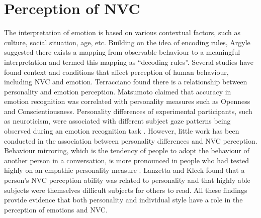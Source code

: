 
\section{Perception of \ac{NVC}}
\label{BackgroundWhatFactorsInfluenceNvcPerception}
\label{BackgroundPeopleVaryInExpression}

The interpretation of emotion is based on various contextual factors, such as culture, social situation, age, etc. Building on the idea of encoding rules, Argyle \cite{Argyle1994} suggested there exists a mapping from observable behaviour to a meaningful interpretation and termed this mapping as ``decoding rules''. Several studies have found context and conditions that affect perception of human behaviour, including \ac{NVC} and emotion. Terracciano \etal \cite{Terracciano2003} found there is a relationship between personality and emotion perception. Matsumoto \etal \cite{Matsumoto2000} claimed that accuracy in emotion recognition was correlated with personality measures such as Openness and Conscientiousness. Personality differences of experimental participants, such as neuroticism, were associated with different subject gaze patterns being observed during an emotion recognition task \cite{Perlman2009}. However, little work has been conducted in the association between personality differences and \ac{NVC} perception. Behaviour mirroring, which is the tendency of people to adopt the behaviour of another person in a conversation, is more pronounced in people who had tested highly on an empathic personality measure \cite{Chartrand1999}. Lanzetta and Kleck \cite{Lanzetta1970} found that a person's \ac{NVC} perception ability was related to personality and that highly able subjects were themselves difficult subjects for others to read. All these findings provide evidence that both personality and individual style have a role in the perception of emotions and \ac{NVC}.


